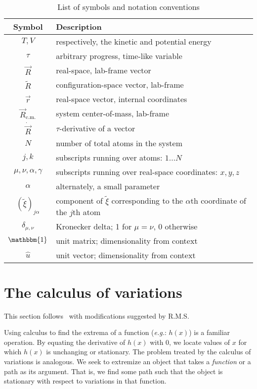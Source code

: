 \documentclass[letter,11pt]{article}
\newcommand{\cvec}[1]{\utilde{#1}}
\newcommand{\svec}[1]{\vec{#1}}
\newcommand{\Rcm}{\svec{R}_{\textrm{c.m.}}}
\begin{document}
\begin{table}
  \begin{center}
    \begin{tabular}{c l}
      \textbf{Symbol} & \textbf{Description} \\
      \hline
      $T,V$ & respectively, the kinetic and potential energy \\
      $\tau$ & arbitrary progress, time-like variable \\
      $\svec{R}$ & real-space, lab-frame vector \\
      $\cvec{R}$ & configuration-space vector, lab-frame \\
      $\svec{r}$ & real-space vector, internal coordinates\\
      $\Rcm$ & system center-of-mass, lab-frame\\
      $\dot{\svec{R}}$ & $\tau$-derivative of a vector\\
      $N$ & number of total atoms in the system \\
      $j,k$ & subscripts running over atoms: $1 \ldots N$ \\
      $\mu,\nu,\alpha,\gamma$ & subscripts running over real-space coordinates: $x,y,z$ \\
      $\alpha$ & alternately, a small parameter\\
      ${\left( \cvec{\xi} \right)}_{j\alpha}$ & component of $\cvec{\xi}$ corresponding to the $\alpha\textrm{th}$ coordinate of the $j\textrm{th}$ atom\\
      $\delta_{\mu,\nu}$ & Kronecker delta; 1 for $\mu=\nu$, 0 otherwise \\
      $\mathbbm{1}$ & unit matrix; dimensionality from context\\
      $\hat{u}$ & unit vector; dimensionality from context
    \end{tabular}
  \end{center}
  \caption{\label{tab:notation}List of symbols and notation conventions}
\end{table}

\section{The calculus of variations}
This section follows~\cite{goldstein:1980} with modifications suggested by R.M.S.

Using calculus to find the extrema of a function (\emph{e.g.}: $h(x)$) is a familiar operation. By equating the derivative of $h(x)$ with $0$, we locate values of $x$ for which $h(x)$ is unchanging or stationary. The problem treated by the calculus of variations is analogous. We seek to extremize an object that takes a \emph{function} or a path as its argument. That is, we find some path such that the object is stationary with respect to variations in that function.
\end{document}
